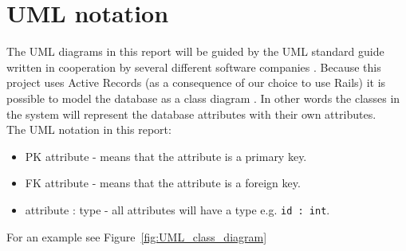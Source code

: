 \section{UML notation} \label{section:uml_notation}

The UML diagrams in this report will be guided by the UML standard guide written in cooperation by several different software companies \citep{UML_notation}.
Because this project uses Active Records (as a consequence of our choice to use Rails) it is possible to model the database as a class diagram \citep{active_records}. 
In other words the classes in the system will represent the database attributes with their own attributes. \\

The UML notation in this report:
\begin{itemize}
	\item PK attribute - means that the attribute is a primary key.
	\item FK attribute - means that the attribute is a foreign key.
	\item attribute : type - all attributes will have a type e.g. \verb+id : int+.
\end{itemize}

For an example see Figure~\ref{fig:UML_class_diagram}